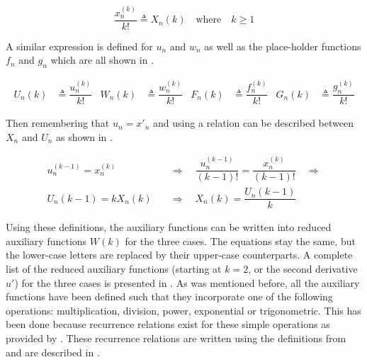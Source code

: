 \begin{equation} \label{eq:tsCoeff}
\dfrac{x_{n}^{\left(k\right)}}{k!} \triangleq X_{n}\left(k\right) \quad \text{where} \quad k \geq 1
\end{equation}

\noindent
A similar expression is defined for $u_{n}$ and $w_{n}$ as well as the place-holder functions $f_{n}$ and $g_{n}$ which are all shown in .

\begin{align} \label{eq:redDer}
U_{n}\left(k\right)& \triangleq \dfrac{u_{n}^{\left(k\right)}}{k!}
&
W_{n}\left(k\right)& \triangleq \dfrac{w_{n}^{\left(k\right)}}{k!}
&
F_{n}\left(k\right)& \triangleq \dfrac{f_{n}^{\left(k\right)}}{k!}
&
G_{n}\left(k\right)& \triangleq \dfrac{g_{n}^{\left(k\right)}}{k!}
\end{align}


\noindent
Then remembering that $u_{n}=x'_{n}$ and using  a relation can be described between $X_{n}$ and $U_{n}$ as shown in  \citep{scott2008high}. 

\begin{equation} \label{eq:UnXn}
\begin{split}
u_{n}^{\left( k-1\right)}=x_{n}^{\left( k\right)} \quad &\Rightarrow \quad \dfrac{u_{n}^{\left( k-1\right)}}{\left(k-1\right)!} = \dfrac{x_{n}^{\left( k\right)}}{\left(k-1\right)!} \quad \Rightarrow\\
U_{n}\left(k-1\right)=kX_{n}\left(k\right) \quad &\Rightarrow \quad X_{n}\left(k\right)=\dfrac{U_{n}\left(k-1\right)}{k}
\end{split}
\end{equation}

\noindent
Using these definitions, the auxiliary functions can be written into reduced auxiliary functions $W\left(k\right)$ for the three cases. The equations stay the same, but the lower-case letters are replaced by their upper-case counterparts. A complete list of the reduced auxiliary functions (starting at $k=2$, or the second derivative $u'$) for the three cases is presented in .
As was mentioned before, all the auxiliary functions have been defined such that they incorporate one of the following operations: multiplication, division, power, exponential or trigonometric. This has been done because recurrence relations exist for these simple operations as provided by \cite{jorba2005software}. These recurrence relations are written using the definitions from  and are described in .

